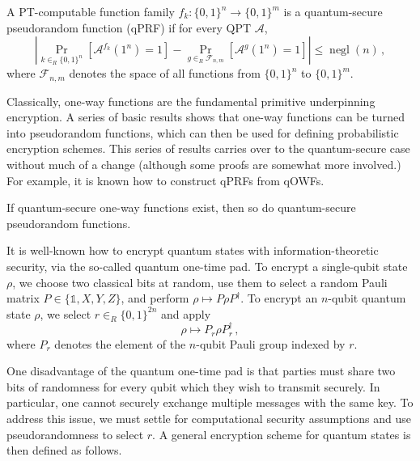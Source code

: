 \documentclass[envcountsame]{llncs}
\numberwithin{equation}{section}
\newcommand{\one}{\mathds 1}
\newcommand{\opn}{\operatorname}
\newcommand{\algo}{\mathcal}
\newcommand{\negl}{\opn{negl}}
\newcommand{\inrand}{\in_R}
\newcommand{\prob}{\opn{Pr}}
\begin{document}
\begin{definition}\label{def:quantum-secure-prf}
A PT-computable function family $f_k : \{0,1\}^n \rightarrow \{0, 1\}^m$ is a quantum-secure pseudorandom function (qPRF) if for every QPT $\algo A$, 
$$
\left|\prob_{k \inrand \{0, 1\}^n} [\algo A^{f_k}(1^n) = 1] - \prob_{g \inrand \mathcal F_{n, m}}[ \algo A^g(1^n) = 1]\right|
\leq \negl(n)\,,
$$
where $\mathcal F_{n, m}$ denotes the space of all functions from $\{0,1\}^n$ to $\{0,1\}^m$.
\end{definition}

Classically, one-way functions are the fundamental primitive underpinning encryption. A series of basic results shows that one-way functions can be turned into pseudorandom functions, which can then be used for defining probabilistic encryption schemes. This series of results carries over to the quantum-secure case without much of a change (although some proofs are somewhat more involved.) For example, it is known how to construct qPRFs from qOWFs.

\begin{theorem}\label{thm:qOWF-implies-qPRF}
If quantum-secure one-way functions exist, then so do quantum-secure pseudorandom functions.
\end{theorem}

It is well-known how to encrypt quantum states with information-theoretic security, via the so-called quantum one-time pad. To encrypt a single-qubit state $\rho$, we choose two classical bits at random, use them to select a random Pauli matrix $P \in \{\one, X, Y, Z\}$, and perform $\rho \mapsto P \rho P^\dagger$. To encrypt an $n$-qubit quantum state $\rho$, we select $r \inrand \{0,1\}^{2n}$ and apply
\begin{equation}\label{eq:quantum-one-time-pad}
\rho \longmapsto P_r \rho P_r^\dagger\,,
\end{equation}
where $P_r$ denotes the element of the $n$-qubit Pauli group indexed by $r$. 

One disadvantage of the quantum one-time pad is that parties must share two bits of randomness for every qubit which they wish to transmit securely. In particular, one cannot securely exchange multiple messages with the same key. To address this issue, we must settle for computational security assumptions and use pseudorandomness to select $r$. A general encryption scheme for quantum states is then defined as follows.
\end{document}
